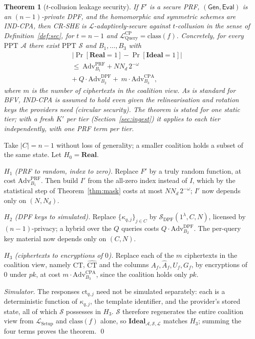 \documentclass[a4paper,fleqn]{cas-dc}
\newtheorem{theorem}{Theorem}
\newcommand{\PPT}{\mathrm{PPT}}
\newcommand{\Real}{\mathbf{Real}}
\newcommand{\Ideal}{\mathbf{Ideal}}
\newcommand{\Leak}{\mathcal{L}}
\newcommand{\Sim}{\mathcal{S}}
\newcommand{\Adv}{\mathcal{A}}
\newcommand{\Gen}{\mathsf{Gen}}
\newcommand{\Eval}{\mathsf{Eval}}
\begin{document}
\begin{theorem}[$t$-collusion leakage security]
\label{thm:sec}
If $F'$ is a secure PRF, $(\Gen,\Eval)$ is an $(n{-}1)$-private DPF, and the
homomorphic and symmetric schemes are IND-CPA, then CR-SHE is
$\Leak$-adaptively-secure against $t$-collusion in the sense of
Definition~\ref{def:sec}, for $t=n-1$ and
$\Leak^{\text{CP}}_{\mathrm{Query}}=\mathrm{class}(f)$. Concretely, for every
$\PPT$ $\Adv$ there exist $\PPT$ $\Sim$ and $B_1,\dots,B_3$ with
\begin{multline*}
\big|\Pr[\Real{=}1]-\Pr[\Ideal{=}1]\big|\\
\le\ \mathrm{Adv}^{\mathrm{PRF}}_{B_1} + N N_d\,2^{-\omega}\\
+\ Q\cdot\mathrm{Adv}^{\mathrm{DPF}}_{B_2}
+\ m\cdot\mathrm{Adv}^{\mathrm{CPA}}_{B_3},
\end{multline*}
where $m$ is the number of ciphertexts in the coalition view. As is standard
for BFV, IND-CPA is assumed to hold even given the relinearisation and
rotation keys the providers need (circular security). The theorem is stated
for one static tier; with a fresh $K'$ per tier
(Section~\ref{sec:ingest}) it applies to each tier independently, with one PRF
term per tier.
\end{theorem}
\begin{pf}
Take $|C|=n-1$ without loss of generality; a smaller coalition holds a subset
of the same state. Let $H_0=\Real$.

\emph{$H_1$ (PRF to random, index to zero).} Replace $F'$ by a truly random
function, at cost $\mathrm{Adv}^{\mathrm{PRF}}_{B_1}$. Then build $I'$ from
the all-zero index instead of $I$, which by the statistical step of
Theorem~\ref{thm:mask} costs at most $N N_d\,2^{-\omega}$; $I'$ now depends
only on $(N,N_d)$.

\emph{$H_2$ (DPF keys to simulated).} Replace $\{\kappa_{q,j}\}_{j\in C}$ by
$\Sim_{\mathrm{DPF}}(1^\lambda,C,N)$, licensed by $(n{-}1)$-privacy; a hybrid
over the $Q$ queries costs $Q\cdot\mathrm{Adv}^{\mathrm{DPF}}_{B_2}$. The
per-query key material now depends only on $(C,N)$.

\emph{$H_3$ (ciphertexts to encryptions of $0$).} Replace each of the $m$
ciphertexts in the coalition view, namely $\text{CT}$, $\widehat{\text{CT}}$
and the columns $A_f,\widehat A_f,U_f,G_f$, by encryptions of $0$ under $pk$,
at cost $m\cdot\mathrm{Adv}^{\mathrm{CPA}}_{B_3}$, since the coalition holds
only $pk$.

\emph{Simulator.} The responses $\text{ct}_{q,j}$ need not be simulated
separately: each is a deterministic function of $\kappa_{q,j}$, the template
identifier, and the provider's stored state, all of which $\Sim$ possesses in
$H_3$. $\Sim$ therefore regenerates the entire coalition view from
$\Leak_{\mathrm{Setup}}$ and $\mathrm{class}(f)$ alone, so
$\Ideal_{\Adv,\Sim,\Leak}$ matches $H_3$; summing the four terms proves the
theorem. \qed
\end{pf}
\end{document}
